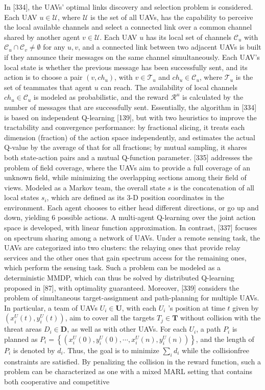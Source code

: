 \documentclass[10pt]{article}
\begin{document}
In [334], the UAVs' optimal links discovery and selection problem is considered. Each UAV $u \in \mathcal{U}$, where $\mathcal{U}$ is the set of all UAVs, has the capability to perceive the local available channels and select a connected link over a common channel shared by another agent $v \in \mathcal{U}$. Each UAV $u$ has its local set of channels $\mathcal{C}_{u}$ with $\mathcal{C}_{u} \cap \mathcal{C}_{v} \neq \emptyset$ for any $u, v$, and a connected link between two adjacent UAVs is built if they announce their messages on the same channel simultaneously. Each UAV's local state is whether the previous message has been successfully sent, and its action is to choose a pair $\left(v, c h_{u}\right)$, with $v \in \mathcal{T}_{u}$ and $c h_{u} \in \mathcal{C}_{u}$, where $\mathcal{T}_{u}$ is the set of teammates that agent $u$ can reach. The availability of local channels $c h_{u} \in \mathcal{C}_{u}$ is modeled as probabilistic, and the reward $\mathcal{R}^{u}$ is calculated by the number of messages that are successfully sent. Essentially, the algorithm in [334] is based on independent Q-learning [139], but with two heuristics to improve the tractability and convergence performance: by fractional slicing, it treats each dimension (fraction) of the action space independently, and estimates the actual Q-value by the average of that for all fractions; by mutual sampling, it shares both state-action pairs and a mutual Q-function parameter. [335] addresses the problem of field coverage, where the UAVs aim to provide a full coverage of an unknown field, while minimizing the overlapping sections among their field of views. Modeled as a Markov team, the overall state $s$ is the concatenation of all local states $s_{i}$, which are defined as its 3-D position coordinates in the environment. Each agent chooses to either head different directions, or go up and down, yielding 6 possible actions. A multi-agent Q-learning over the joint action space is developed, with linear function approximation. In contrast, [337] focuses on spectrum sharing among a network of UAVs. Under a remote sensing task, the UAVs are categorized into two clusters: the relaying ones that provide relay services and the other ones that gain spectrum access for the remaining ones, which perform the sensing task. Such a problem can be modeled as a deterministic MMDP, which can thus be solved by distributed Q-learning proposed in [87], with optimality guaranteed. Moreover, [339] considers the problem of simultaneous target-assignment and path-planning for multiple UAVs. In particular, a team of UAVs $U_{i} \in \mathbf{U}$, with each $U_{i}$ 's position at time $t$ given by $\left(x_{i}^{U}(t), y_{i}^{U}(t)\right)$, aim to cover all the targets $T_{j} \in \mathbf{T}$ without collision with the threat areas $D_{i} \in \mathbf{D}$, as well as with other UAVs. For each $U_{i}$, a path $P_{i}$ is planned as $P_{i}=\left\{\left(x_{i}^{U}(0), y_{i}^{U}(0), \cdots, x_{i}^{U}(n), y_{i}^{U}(n)\right)\right\}$, and the length of $P_{i}$ is denoted by $d_{i}$. Thus, the goal is to minimize $\sum_{i} d_{i}$ while the collisionfree constraints are satisfied. By penalizing the collision in the reward function, such a problem can be characterized as one with a mixed MARL setting that contains both cooperative and competitive 
\end{document}
